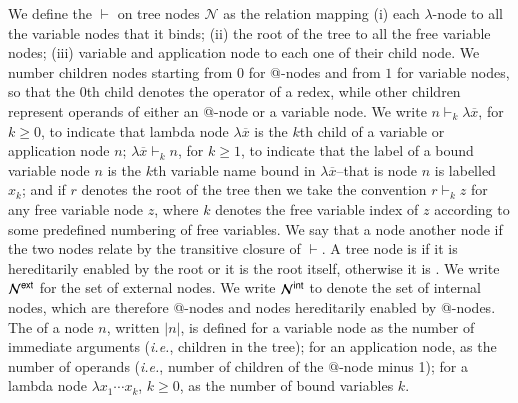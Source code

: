 \documentclass{elsarticle}
\makeatletter
\theoremstyle{plain}
\theoremstyle{definition}
\newcommand\Nodes{\mathcal{N}}%
\newcommand{\enables}{\vdash} %
\newcommand{\ExternalNodes}{\Nodes^{\sf ext}}
\newcommand{\InternalNodes}{\Nodes^{\sf int}}
\renewcommand\ie{{\it i.e.\@\xspace}}
\makeatother
\begin{document}
We define the  $\enables$ on tree nodes $\Nodes$ as the relation mapping (i) each $\lambda$-node to all the variable nodes that it binds; (ii) the root of the tree to all the free variable nodes; (iii) variable and application node to each one of their child node.
We number children nodes starting from $0$ for @-nodes and from $1$ for variable nodes, so that the $0$th child denotes the operator of a redex, while other children represent operands of either an @-node or a variable node.
%
We write
$n \enables_k \lambda\overline{x}$, for $k\geq0$, to indicate that
lambda node $\lambda\overline{x}$ is the $k$th child of a variable or application node $n$;
$\lambda\overline{x} \enables_k n$, for $k\geq1$, to indicate that the label of a bound variable node $n$ is the $k$th variable name bound in $\lambda\overline{x}$--that is node $n$ is labelled $x_k$;
 and if $r$ denotes the root of the tree then we take the convention $r \enables_k z$ for any free variable node $z$, where $k$ denotes the free variable index of $z$ according to some predefined numbering of free variables.
%
We say that a node  another node if the two nodes relate by the transitive closure of $\enables$.
%
A tree node is  if it is hereditarily enabled by the root or it is the root itself, otherwise it is . We write $\ExternalNodes$ for the set of external nodes.
We write $\InternalNodes$ to denote the set of internal nodes, which are therefore @-nodes and nodes hereditarily enabled by @-nodes.
The  of a node $n$, written $|n|$,
is defined for a variable node as the number of immediate arguments (\ie, children in the tree); for an application node, as the number of operands (\ie, number of children of the $@$-node minus 1); for a lambda node $\lambda x_1 \cdots x_k$, $k\geq 0$, as the number of bound variables $k$.
\end{document}
